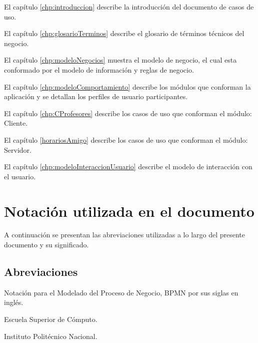 \begin{Citemize}
	
	\item El capítulo \ref{chp:introduccion} describe la introducción del documento de casos de uso.
	
	\item El capítulo \ref{chp:glosarioTerminos} describe el glosario de términos técnicos del negocio.
	
	\item El capítulo \ref{chp:modeloNegocios}  muestra el modelo de negocio, el cual esta conformado por el modelo de información y reglas de negocio.
	
	\item El capítulo \ref{chp:modeloComportamiento} describe los módulos que conforman la aplicación y se detallan los perfiles de usuario participantes.
	
	\item El capítulo \ref{chp:CProfesores} describe los casos de uso que conforman el módulo: Cliente.
	
	\item El capítulo \ref{horariosAmigo} describe los casos de uso que conforman el módulo: Servidor.
	
	\item El capítulo \ref{chp:modeloInteraccionUsuario} describe el modelo de interacción con el usuario.
	
\end{Citemize}

\section{Notación utilizada en el documento}\label{sec:notacion}

A continuación se presentan las abreviaciones utilizadas a lo largo del presente documento y su significado.

\subsection{Abreviaciones}\label{ssec:abreviaciones}

\begin{description}

	 Notación para el Modelado del Proceso de Negocio, BPMN por sus siglas en inglés.
	
	 Escuela Superior de Cómputo. 
	
	 Instituto Politécnico Nacional.

\end{description}

